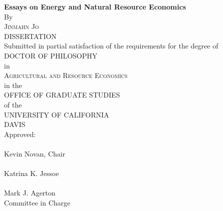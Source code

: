 \begin{center}
   \null\vfill
   \textbf{%
      Essays on Energy and Natural Resource Economics
   }%
   \\
   \bigskip
   By \\
   \bigskip
   \textsc{Jinmahn Jo} \\
   \bigskip
   \bigskip
   \bigskip
   DISSERTATION \\
   \bigskip
   Submitted in partial satisfaction of the requirements for the
   degree of \\
   \bigskip
   DOCTOR OF PHILOSOPHY \\
   \bigskip
   in \\
   \bigskip
   \textsc{Agricultural and Resource Economics} \\
   \bigskip
   in the \\
   \bigskip
   OFFICE OF GRADUATE STUDIES \\
   \bigskip        
   of the \\
   \bigskip
   UNIVERSITY OF CALIFORNIA \\
   \bigskip
   DAVIS \\
   \bigskip
   \bigskip
   \bigskip
   Approved: \\
   \bigskip
   \bigskip
   \makebox[3in]{\hrulefill} \\
   Kevin Novan, Chair \\
   \bigskip
   \bigskip
   \makebox[3in]{\hrulefill} \\
   Katrina K. Jessoe \\
   \bigskip
   \bigskip
   \makebox[3in]{\hrulefill} \\
   Mark J. Agerton \\
   \bigskip
   Committee in Charge \\
    \\
   \vfill
\end{center}
